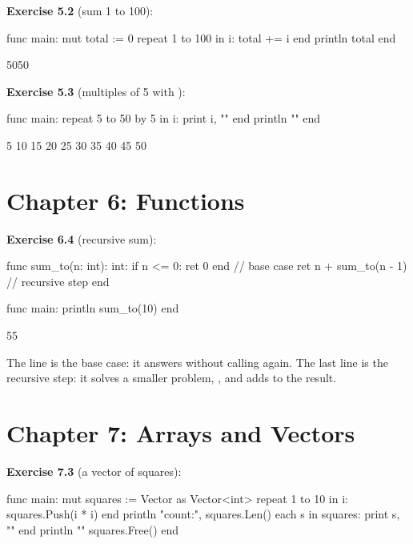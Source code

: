 \textbf{Exercise 5.2} (sum 1 to 100):

\begin{salamen}
func main:
    mut total := 0
    repeat 1 to 100 in i:
        total += i
    end
    println total
end
\end{salamen}

\begin{progout}
5050
\end{progout}

\textbf{Exercise 5.3} (multiples of 5 with ):

\begin{salamen}
func main:
    repeat 5 to 50 by 5 in i:
        print i, ""
    end
    println ""
end
\end{salamen}

\begin{progout}
5 10 15 20 25 30 35 40 45 50
\end{progout}

\section*{Chapter 6: Functions}

\textbf{Exercise 6.4} (recursive sum):

\begin{salamen}
func sum_to(n: int): int:
    if n <= 0: ret 0 end       // base case
    ret n + sum_to(n - 1)      // recursive step
end

func main:
    println sum_to(10)
end
\end{salamen}

\begin{progout}
55
\end{progout}

The  line is the base case: it answers without calling
 again. The last line is the recursive step: it solves a smaller
problem, , and adds  to the result.

\section*{Chapter 7: Arrays and Vectors}

\textbf{Exercise 7.3} (a vector of squares):

\begin{salamen}
func main:
    mut squares := Vector {} as Vector<int>
    repeat 1 to 10 in i:
        squares.Push(i * i)
    end
    println "count:", squares.Len()
    each s in squares:
        print s, ""
    end
    println ""
    squares.Free()
end
\end{salamen}

